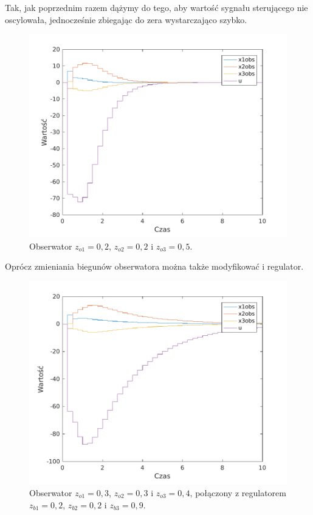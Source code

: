 Tak, jak poprzednim razem dążymy do tego, aby wartość sygnału sterującego nie oscylowała, jednocześnie zbiegając do zera wystarczająco szybko.
\begin{figure}[H]
\centering
 \includegraphics[width=\textwidth]{img/obsreg3.pdf}
\caption{Obserwator $z_{o1}=0,2$, $z_{o2}=0,2$ i $z_{o3}=0,5$.}
\end{figure}

Oprócz zmieniania biegunów obserwatora można także modyfikować i regulator.

\begin{figure}[H]
\centering
 \includegraphics[width=\textwidth]{img/obsreg4.pdf}
\caption{Obserwator $z_{o1}=0,3$, $z_{o2}=0,3$ i $z_{o3}=0,4$, połączony z regulatorem $z_{b1}=0,2$, $z_{b2}=0,2$ i $z_{b3}=0,9$.}
\end{figure}

